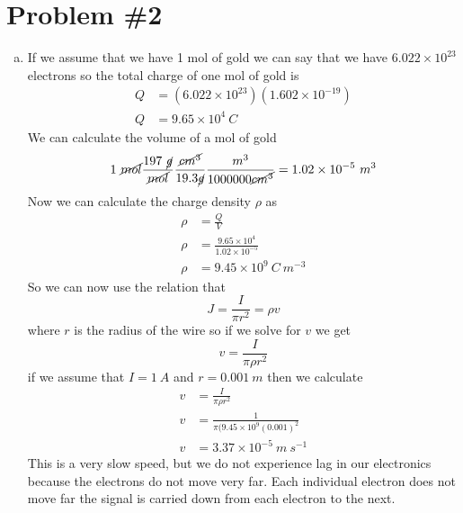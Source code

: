 \documentclass[11pt]{article}
\numberwithin{equation}{section}
\begin{document}
\begin{enumerate}[(a)]
\end{enumerate}

\section{Problem \#2}
\begin{enumerate}[(a)]
\item
If we assume that we have 1 mol of gold we can say that we have $6.022\times10^{23}$ electrons so the total charge of one mol of gold is
\begin{align*}
Q &= (6.022\times10^{23})(1.602\times10^{-19})\\
Q &= 9.65\times10^{4}\ C
\end{align*}
We can calculate the volume of a mol of gold 
$$1\ \cancel{mol}\frac{197\ \cancel{g}}{\cancel{mol}}\frac{\cancel{cm^3}}{19.3 \cancel{g}}\frac{m^3}{1000000 \cancel{cm^3}} = 1.02\times10^{-5}\ m^3$$
Now we can calculate the charge density $\rho$ as
\begin{align*}
\rho &= \frac{Q}{V}\\
\rho &= \frac{9.65\times10^4}{1.02\times10^{-5}}\\
\rho &= 9.45\times10^9\ C\ m^{-3}
\end{align*}
So we can now use the relation that 
$$J = \frac{I}{\pi r^2} =\rho v$$
where $r$ is the radius of the wire so if we solve for $v$ we get
$$v = \frac{I}{\pi\rho r^2}$$
if we assume that $I = 1\ A$ and $r = 0.001\ m$ then we calculate
\begin{align*}
v &= \frac{I}{\pi\rho r^2}\\
v &= \frac{1}{\pi(9.45\times10^{9} (0.001)^2}\\
v &= 3.37\times10^{-5}\ m\ s^{-1}
\end{align*}
This is a very slow speed, but we do not experience lag in our electronics because the electrons do not move very far. Each individual electron does not move far the signal is carried down from each electron to the next.


\end{enumerate}
\end{document}
